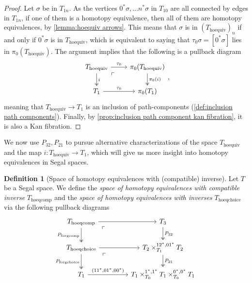 \documentclass[11pt, a4paper]{amsart}
\newcommand{\hoequiv}{\mathrm{hoequiv}}
\newcommand{\hoeqchoice}{\mathrm{hoeqchoice}}
\newcommand{\hoeqcomp}{\mathrm{hoeqcomp}}
\newcommand{\forgcomp}{\mathrm{forgcomp}}
\newcommand{\forgchoice}{\mathrm{forgchoice}}
\theoremstyle{definition}
\newtheorem{definition}[equation]{Definition}
\theoremstyle{remark}
\numberwithin{equation}{section}
\begin{document}
\begin{proof}
  Let $\sigma$ be in $T_{1n}$. As the vertices $0^*\sigma, ... n^*\sigma$ in $T_{10}$ are all connected by edges in $T_{1n}$, if one of them is a homotopy equivalence, then all of them are homotopy equivalences, by \cref{lemma:hoequiv arrows}. This means that $\sigma$ is in $(T_{\hoequiv})_n$ if and only if $0^*\sigma$ is in $T_{\hoequiv}$, which is equivalent to saying that $\tau_0\sigma = [0^*\sigma]$ lies in $\pi_0(T_{\hoequiv})$. The argument implies that the following is a pullback diagram
  \[
  \begin{tikzcd}
  T_{\hoequiv} \arrow[r, "\tau_0"] \arrow[d, "i", twoheadrightarrow] \arrow[dr, phantom, "\ulcorner", very near start] & \pi_0(T_{\hoequiv}) \arrow[d, "\pi_0(i)", twoheadrightarrow] \\
  T_1  \arrow[r, "\tau_0"] & \pi_0(T_1)
  \end{tikzcd},
  \]  
  meaning that $T_{\hoequiv} \to T_1$ is an inclusion of path-components (\cref{def:inclusion path components}). Finally, by \cref{prop:inclusion path component kan fibration}, it is also a Kan fibration.
\end{proof}

We now use $P_{32}, P_{21}$ to pursue alternative characterizations of the space $T_{\hoequiv}$ and the map $i\colon T_{\hoequiv} \to T_1$, which will give us more insight into homotopy equivalences in Segal spaces.

\begin{definition}[Space of homotopy equivalences with (compatible) inverse] \label{def:hoeqchoice}
  Let $T$ be a Segal space. We define the \emph{space of homotopy equivalences with compatible inverse} $T_{\hoeqcomp}$ and the \emph{space of homotopy equivalences with inverses} $T_{\hoeqchoice}$ via the following pullback diagrams
  \[
  \begin{tikzcd}[column sep=1.5cm]
    T_{\hoeqcomp} \arrow[d, "P_{\forgcomp}"', twoheadrightarrow] \arrow[r] \arrow[dr, phantom, "\ulcorner", very near start] & T_3 \arrow[d, "P_{32}", twoheadrightarrow] \\
    T_{\hoeqchoice} \arrow[d, "P_{\forgchoice}"', twoheadrightarrow] \arrow[r] \arrow[dr, phantom, "\ulcorner", very near start] & T_2 \times^{12^*,01^*}_{T_1} T_2 \arrow[d, "P_{21}", twoheadrightarrow] \\
    T_1 \arrow[r, "{(11^* , 01^* , 00^*)}"] & T_1 \times^{1^*,1^*}_{T_0} T_1 \times^{0^*,0^*}_{T_0} T_1
   \end{tikzcd}
  \]
\end{definition}
\end{document}
